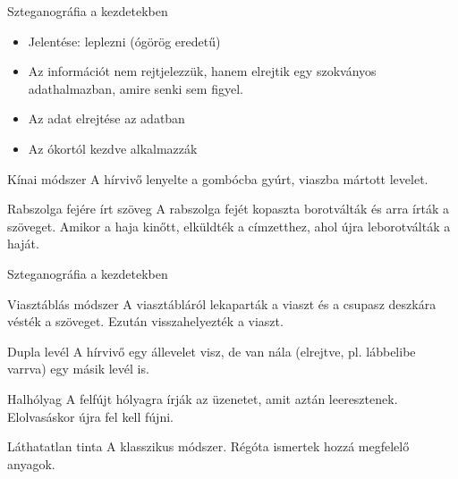 \documentclass[12 pt]{beamer}
\begin{document}

\begin{frame}{Szteganográfia a kezdetekben}
  \begin{itemize}
    \item{Jelentése: leplezni (ógörög eredetű)}
    \item{Az információt nem rejtjelezzük, hanem elrejtik egy szokványos adathalmazban, amire senki sem figyel.}
    \item{Az adat elrejtése az adatban}
    \item{Az ókortól kezdve alkalmazzák}
  \end{itemize}

  \begin{block}{Kínai módszer}
    A hírvivő lenyelte a gombócba gyúrt, viaszba mártott levelet.
  \end{block}

  \begin{block}{Rabszolga fejére írt szöveg}
    A rabszolga fejét kopaszta borotválták és arra írták a szöveget. Amikor a haja kinőtt, elküldték a címzetthez, ahol újra leborotválták a haját.
  \end{block}

\end{frame}


\begin{frame}{Szteganográfia a kezdetekben}

  \begin{block}{Viasztáblás módszer}
    A viasztábláról lekaparták a viaszt és a csupasz deszkára vésték a szöveget. Ezután visszahelyezték a viaszt.
  \end{block}

  \begin{block}{Dupla levél}
    A hírvivő egy állevelet visz, de van nála (elrejtve, pl. lábbelibe varrva) egy másik levél is.
  \end{block}

  \begin{block}{Halhólyag}
    A felfújt hólyagra írják az üzenetet, amit aztán leeresztenek. Elolvasáskor újra fel kell fújni.
  \end{block}

  \begin{block}{Láthatatlan tinta}
    A klasszikus módszer. Régóta ismertek hozzá megfelelő anyagok.
  \end{block}
  
\end{frame}
\end{document}
